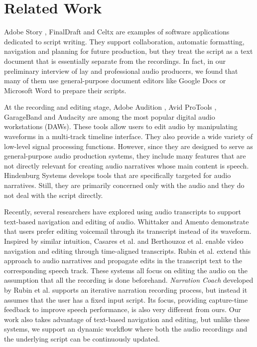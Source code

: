 \section{Related Work}

Adobe Story \cite{adobestory2016}, FinalDraft \cite{finaldraft2016} and Celtx \cite{celtx2016} are examples of software applications dedicated to script writing. They support collaboration, automatic formatting, navigation and planning for future production, but they treat the script as a text document that is essentially separate from the recordings. In fact, in our preliminary interview of lay and professional audio producers, we found that many of them use general-purpose document editors like Google Docs \cite{googledocs2016} or Microsoft Word \cite{microsoftword2016} to prepare their scripts.

At the recording and editing stage, Adobe Audition \cite{adobeaudition2016}, Avid ProTools \cite{avidprotools}, GarageBand \cite{garageband} and Audacity \cite{audacity} are among the most popular digital audio workstations (DAWs). These tools allow users to edit audio by manipulating waveforms in a multi-track timeline interface. They also provide a wide variety of low-level signal processing functions. However, since they are designed to serve as general-purpose audio production systems, they include many features that are not directly relevant for creating audio narratives whose main content is speech. Hindenburg Systems \cite{hindenburg} develops tools that are specifically targeted for audio narratives. Still, they are primarily concerned only with the audio and they do not deal with the script directly.   

Recently, several researchers have explored using audio transcripts to support text-based navigation and editing of audio. Whittaker and Amento \cite{whittaker2004semantic} demonstrate that users prefer editing voicemail through its transcript instead of its waveform. Inspired by similar intuition, Casares et al. \cite{casares2002simplifying} and Berthouzoz et al. \cite{berthouzoz2012tools} enable video navigation and editing through time-aligned transcripts. Rubin et al. \cite{rubin2013content} extend this approach to audio narratives and propagate edits in the transcript text to the corresponding speech track. These systems all focus on editing the audio on the assumption that all the recording is done beforehand. \textit{Narration Coach} developed by Rubin et al. 
supports an iterative narration recording process, but instead it assumes that the user has a fixed input script. Its focus, providing capture-time feedback to improve speech performance, is also very different from ours. Our work also takes advantage of text-based navigation and editing, but unlike these systems, we support an dynamic workflow where both the audio recordings and the underlying script can be continuously  updated.      